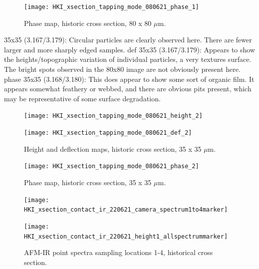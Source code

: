 \begin{figure}[H]
\centering
  \texttt{[image: HKI\_xsection\_tapping\_mode\_080621\_phase\_1]}
\caption[Phase map, historic cross section]{Phase map, historic cross section, 80 x 80 $\mu$m.}
\label{fig:afm_xsection_phase_1}
\end{figure}

35x35 (3.167/3.179): Circular particles are clearly observed here. There are fewer larger and more sharply edged samples.
def 35x35 (3.167/3.179): Appears to show the heights/topographic variation of individual particles, a very textures surface. The bright spots observed in the 80x80 image are not obviously present here.
phase 35x35 (3.168/3.180): This does appear to show some sort of organic film. It appears somewhat feathery or webbed, and there are obvious pits present, which may be representative of some surface degradation.


\begin{figure}[H]
\centering
\begin{minipage}{.45\textwidth}
  \centering
  \texttt{[image: HKI\_xsection\_tapping\_mode\_080621\_height\_2]}
\end{minipage}
\begin{minipage}{.45\textwidth}
  \centering
  \texttt{[image: HKI\_xsection\_tapping\_mode\_080621\_def\_2]}
\end{minipage}
\caption[Height and deflection maps, historic cross section]{Height and deflection maps, historic cross section, 35 x 35 $\mu$m.}
\label{fig:afm_xsection_height_def_2}
\end{figure}

\begin{figure}[H]
\centering
  \texttt{[image: HKI\_xsection\_tapping\_mode\_080621\_phase\_2]}
\caption[Phase map, historic cross section]{Phase map, historic cross section, 35 x 35 $\mu$m.}
\label{fig:afm_xsection_phase_2}
\end{figure}



\begin{figure}[H]
\centering
\begin{minipage}{.45\textwidth}
  \centering
  \texttt{[image: HKI\_xsection\_contact\_ir\_220621\_camera\_spectrum1to4marker]}
\end{minipage}
\begin{minipage}{.45\textwidth}
  \centering
  \texttt{[image: HKI\_xsection\_contact\_ir\_220621\_height1\_allspectrummarker]}
\end{minipage}
\caption[AFM-IR point spectra sampling locations, historical cross section]{AFM-IR point spectra sampling locations 1-4, historical cross section.}
\label{fig:afm_xsection_camera_speclocs_height_1}
\end{figure}


